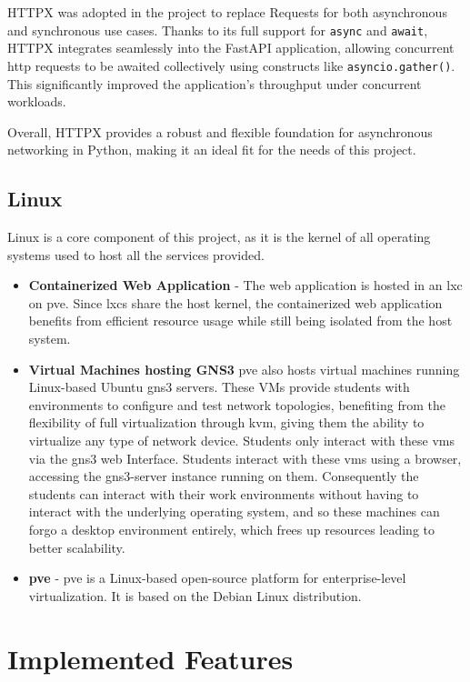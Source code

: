   HTTPX was adopted in the project to replace Requests for both asynchronous and synchronous use cases. Thanks to its full 
  support for \texttt{async} and \texttt{await}, HTTPX integrates seamlessly into the FastAPI application, allowing 
  concurrent \ac{http} requests to be awaited collectively using constructs like \texttt{asyncio.gather()}. This significantly 
  improved the application's throughput under concurrent workloads.

  Overall, HTTPX provides a robust and flexible foundation for asynchronous networking in Python, making it an ideal 
  fit for the needs of this project.


\subsection{Linux}
  Linux is a core component of this project, as it is the kernel of all operating systems used to host all the services provided.

  \begin{itemize}
    \item \textbf{Containerized Web Application} - The web application is hosted in an \ac{lxc} on \ac{pve}. Since \ac{lxc}s share 
    the host kernel, the containerized web application benefits from efficient resource usage while still being isolated from the host system.
    \item \textbf{Virtual Machines hosting GNS3} \ac{pve} also hosts virtual machines running Linux-based Ubuntu \ac{gns3} servers. 
    These VMs provide students with environments to configure and test network topologies, benefiting from the 
    flexibility of full virtualization through \ac{kvm}, giving them the ability to virtualize any type of network device.
    Students only interact with these \ac{vm}s via the \ac{gns3} web Interface. Students interact with these \ac{vm}s using a browser, 
    accessing the gns3-server instance running on them. Consequently the students can interact with their work environments without having to 
    interact with the underlying operating system, and so these machines can forgo a desktop environment entirely, which frees up resources 
    leading to better scalability.
    \item \textbf{\ac{pve}} - \ac{pve} is a Linux-based open-source platform for enterprise-level virtualization. It is based
    on the Debian Linux distribution.
  \end{itemize}

\section{Implemented Features}

